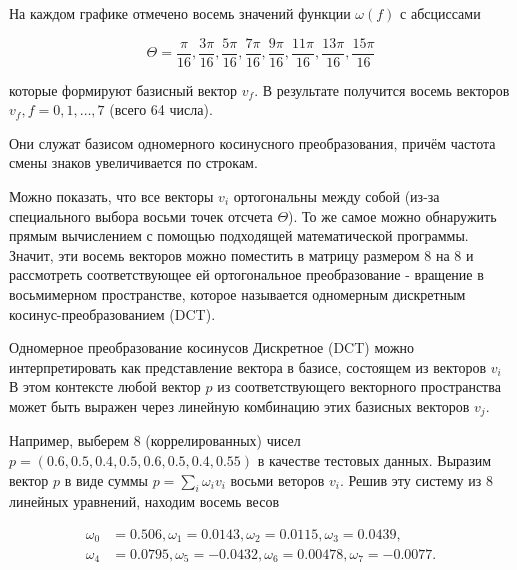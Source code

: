 На каждом графике отмечено восемь значений функции $\omega(f)$ с абс­циссами

\begin{equation}
    \Theta = \frac{\pi}{16}, 
                \frac{3\pi}{16}, 
                \frac{5\pi}{16}, 
                \frac{7\pi}{16}, 
                \frac{9\pi}{16}, 
                \frac{11\pi}{16}, 
                \frac{13\pi}{16}, 
                \frac{15\pi}{16}
\end{equation}


которые формируют базисный вектор $v_f$. В результате получится восемь векторов $v_f, f = 0, 1, \dots, 7$ (всего 64 числа).

\clearpage
\BasisDCT

Они служат базисом одномерного косинусного преобразования, причём частота смены знаков увеличивается по строкам.

Можно показать, что все векторы $v_i$ ортогональны между со­бой (из-за специального выбора восьми точек отсчета $\Theta$). 
То же самое можно обнаружить прямым вычислением с помощью подхо­дящей математической программы. 
Значит, эти восемь векторов можно поместить в матрицу размером 8 на 8 и рассмотреть соот­ветствующее ей ортогональное преобразование - 
вращение в вось­мимерном пространстве, которое называется одномерным дискрет­ным косинус-преобразованием (DCT). 

Одномерное преобразование косинусов Дискретное (DCT) можно интерпретировать как представление вектора в базисе, состоящем из векторов $v_i$
В этом контексте любой вектор $p$ из соответствующего векторного пространства может быть выражен через линейную комбинацию этих базисных векторов $v_j$.


Например, выберем 8 (коррелированных) чисел $p=(0.6, 0.5, 0.4, 0.5, 0.6, 0.5, 0.4, 0.55)$ в качестве тестовых данных. 
Выразим вектор $p$ в виде суммы $p = \sum_{i}^{} \omega_i v_i$ восьми веторов $v_i$. 
Решив эту систему из 8 линейных уравнений, находим восемь весов

\begin{equation}
    \begin{aligned}
        \omega_0 &=0.506, \omega_1 = 0.0143, \omega_2 = 0.0115, \omega_3 = 0.0439, \\
        \omega_4 &=0.0795, \omega_5 = -0.0432, \omega_6 = 0.00478, \omega_7 = -0.0077.
    \end{aligned}
\end{equation}


